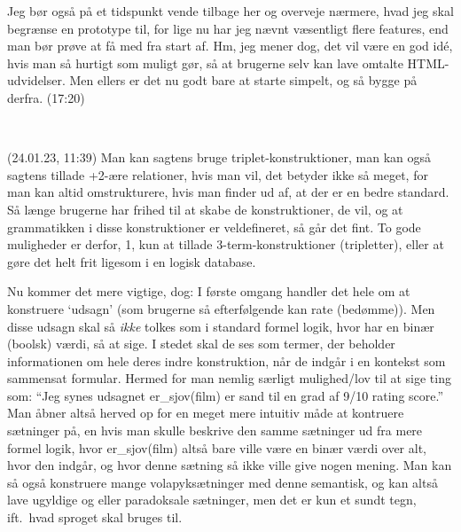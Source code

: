\documentclass{report}
\begin{document}
Jeg bør også på et tidspunkt vende tilbage her og overveje nærmere, hvad jeg skal begrænse en prototype til, for lige nu har jeg nævnt væsentligt flere features, end man bør prøve at få med fra start af. Hm, jeg mener dog, det vil være en god idé, hvis man så hurtigt som muligt gør, så at brugerne selv kan lave omtalte HTML-udvidelser. Men ellers er det nu godt bare at starte simpelt, og så bygge på derfra. (17:20)

\ 

(24.01.23, 11:39) Man kan sagtens bruge triplet-konstruktioner, man kan også sagtens tillade +2-ære relationer, hvis man vil, det betyder ikke så meget, for man kan altid omstrukturere, hvis man finder ud af, at der er en bedre standard. Så længe brugerne har frihed til at skabe de konstruktioner, de vil, og at grammatikken i disse konstruktioner er veldefineret, så går det fint. To gode muligheder er derfor, 1, kun at tillade 3-term-konstruktioner (tripletter), eller at gøre det helt frit ligesom i en logisk database.

Nu kommer det mere vigtige, dog: I første omgang handler det hele om at konstruere `udsagn' (som brugerne så efterfølgende kan rate (bedømme)). Men disse udsagn skal så \emph{ikke} tolkes som i standard formel logik, hvor har en binær (boolsk) værdi, så at sige. I stedet skal de ses som termer, der beholder informationen om hele deres indre konstruktion, når de indgår i en kontekst som sammensat formular. Hermed for man nemlig særligt mulighed/lov til at sige ting som: ``Jeg synes udsagnet er\_sjov(film) er sand til en grad af 9/10 rating score.'' Man åbner altså herved op for en meget mere intuitiv måde at kontruere sætninger på, en hvis man skulle beskrive den samme sætninger ud fra mere formel logik, hvor er\_sjov(film) altså bare ville være en binær værdi over alt, hvor den indgår, og hvor denne sætning så ikke ville give nogen mening. Man kan så også konstruere mange volapyksætninger med denne semantisk, og kan altså lave ugyldige og eller paradoksale sætninger, men det er kun et sundt tegn, ift.\ hvad sproget skal bruges til. 
\end{document}
